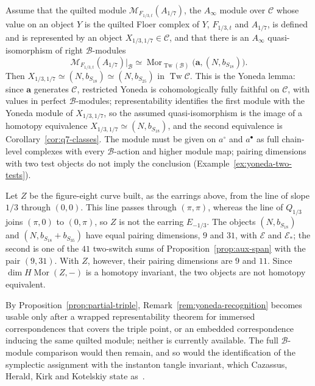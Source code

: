 \begin{remark}\label{rem:yoneda-recognition}
Assume that the quilted module $\mathcal M_{F_{1/3,t}}(A_{1/7})$, the $A_\infty$ module over $\mathcal C$
whose value on an object $Y$ is the quilted Floer complex of $Y$, $F_{1/3,t}$ and $A_{1/7}$, is defined and is
represented by an object $X_{1/3,1/7}\in\mathcal C$, and that there is an $A_\infty$ quasi-isomorphism of
right $\mathcal B$-modules
\[
 \mathcal M_{F_{1/3,t}}(A_{1/7})\big|_{\mathcal B}
 \simeq
 \operatorname{Mor}_{\operatorname{Tw}(\mathcal B)}\bigl(\mathbf a,(N,b_{S_{18}})\bigr).
\]
Then $X_{1/3,1/7}\simeq(N,b_{S_{18}})\simeq(N,b_{S_{25}})$ in $\operatorname{Tw}\mathcal C$.  This is the Yoneda lemma:
since $\mathbf a$ generates $\mathcal C$, restricted Yoneda is cohomologically fully faithful on
$\mathcal C$, with values in perfect $\mathcal B$-modules; representability identifies the first module
with the Yoneda module of $X_{1/3,1/7}$, so the assumed quasi-isomorphism is the image of a homotopy
equivalence $X_{1/3,1/7}\simeq(N,b_{S_{18}})$, and the second equivalence is
Corollary~\ref{cor:q7-classes}.  The module must be given on $a^\circ$ and $a^\bullet$ as full chain-level
complexes with every $\mathcal B$-action and higher module map; pairing dimensions with two test objects
do not imply the conclusion (Example~\ref{ex:yoneda-two-tests}).
\end{remark}

\begin{example}\label{ex:yoneda-two-tests}
Let $Z$ be the figure-eight curve built, as the earrings above, from the line of slope $1/3$ through
$(0,0)$.  This line passes through $(\pi,\pi)$, whereas the line of $Q_{1/3}$ joins $(\pi,0)$ to
$(0,\pi)$, so $Z$ is not the earring $E_{-1/3}$.  The objects $(N,b_{S_{18}})$ and
$(N,b_{S_{18}}+b_{S_{35}})$ have equal pairing dimensions, $9$ and $31$, with $\mathcal E$ and
$\mathcal E_*$; the second is one of the $41$ two-switch sums of Proposition~\ref{prop:aux-span} with the
pair $(9,31)$.  With $Z$, however, their pairing dimensions are $9$ and $11$.  Since
$\dim H\operatorname{Mor}(Z,-)$ is a homotopy invariant, the two objects are not homotopy equivalent.
\end{example}

By Proposition~\ref{prop:partial-triple}, Remark~\ref{rem:yoneda-recognition} becomes usable only after a
wrapped representability theorem for immersed correspondences that covers the triple point, or an embedded
correspondence inducing the same quilted module; neither is currently available.  The full
$\mathcal B$-module comparison would then remain, and so would the identification of the symplectic
assignment with the instanton tangle invariant, which Cazassus, Herald, Kirk and Kotelskiy state
as~\cite[Conj.~D]{CHKK}.
